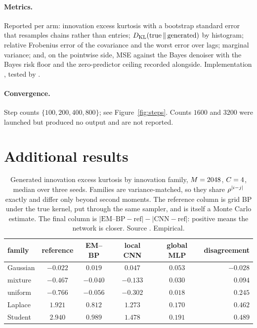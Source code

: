 \paragraph{Metrics.} Reported per arm: innovation excess kurtosis with a bootstrap standard error
that resamples chains rather than entries; $D_{\mathrm{KL}}(\text{true}\,\|\,\text{generated})$ by histogram;
relative Frobenius error of the covariance and the worst error over lags; marginal variance;
and, on the pointwise side, MSE against the Bayes denoiser with the Bayes risk floor and the
zero-predictor ceiling recorded alongside. Implementation ,
tested by .

\paragraph{Convergence.} Step counts $\{100,200,400,800\}$; see Figure~\ref{fig:steps}. Counts
$1600$ and $3200$ were launched but produced no output and are not reported.

\section{Additional results}
\label{app:extra}

\begin{table}[h]
\caption{Generated innovation excess kurtosis by innovation family, $M=2048$, $C=4$,
median over three seeds. Families are variance-matched, so they share $\rho^{|i-j|}$ exactly and
differ only beyond second moments. The reference column is grid BP under the true kernel, put
through the same sampler, and is itself a Monte Carlo estimate. The final column is
$|\text{EM--BP}-\text{ref}| - |\text{CNN}-\text{ref}|$: positive means the network is closer.
Source . Empirical.}
\label{tab:families}
\centering
\begin{tabular}{lccccr}
\toprule
family & reference & EM--BP & local CNN & global MLP & disagreement \\
\midrule
Gaussian & $-0.022$ & $0.019$ & $0.047$ & $0.053$ & $\mathbf{-0.028}$ \\
mixture  & $-0.467$ & $-0.040$ & $-0.133$ & $0.030$ & $0.094$ \\
uniform  & $-0.766$ & $-0.056$ & $-0.302$ & $0.018$ & $0.245$ \\
Laplace  & $1.921$ & $0.812$ & $1.273$ & $0.170$ & $0.462$ \\
Student  & $2.940$ & $0.989$ & $1.478$ & $0.191$ & $0.489$ \\
\bottomrule
\end{tabular}
\end{table}


